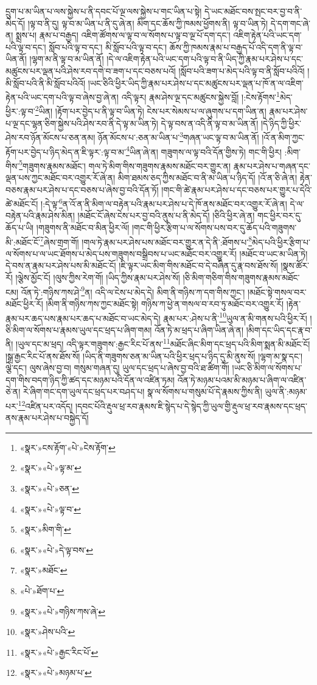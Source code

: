 དྲུག་པ་མ་ཡིན་པ་ལས་སྐྱེས་པ་ནི་དབང་པོ་ལྔ་ལས་སྐྱེས་པ་གང་ཡིན་པ་སྟེ། དེ་ཡང་མཐོང་བས་སྤང་བར་བྱ་བ་ནི་མེད་དོ། །ལྟ་བ་ནི་དུ། ལྟ་བ་མ་ཡིན་པ་ནི་དུ་ཞེ་ན། མིག་དང་ཆོས་ཀྱི་ཁམས་ཕྱོགས་ནི། ལྟ་བ་ཡིན་ཏེ། དེ་དག་གང་ཞེ་ན། སྨྲས་པ། རྣམ་པ་བརྒྱད། འཇིག་ཚོགས་ལ་ལྟ་བ་ལ་སོགས་པ་ལྟ་བ་ལྔ་པོ་དག་དང་། འཇིག་རྟེན་པའི་ཡང་དག་པའི་ལྟ་བ་དང་། སློབ་པའི་ལྟ་བ་དང་། མི་སློབ་པའི་ལྟ་བ་དང་། ཆོས་ཀྱི་ཁམས་རྣམ་པ་བརྒྱད་པོ་འདི་དག་ནི་ལྟ་བ་ཡིན་ནོ། །ལྷག་མ་ནི་ལྟ་བ་མ་ཡིན་ནོ། །དེ་ལ་འཇིག་རྟེན་པའི་ཡང་དག་པའི་ལྟ་བ་ནི་ཡིད་ཀྱི་རྣམ་པར་ཤེས་པ་དང་མཚུངས་པར་ལྡན་པའི་ཤེས་རབ་དགེ་བ་ཟག་པ་དང་བཅས་པའོ། །སློབ་པའི་ཟག་པ་མེད་པའི་ལྟ་བ་ནི་སློབ་པའིའོ། །མི་སློབ་པའི་ནི་མི་སློབ་པའིའོ། །ཡང་ཅིའི་ཕྱིར་ཡིད་ཀྱི་རྣམ་པར་ཤེས་པ་དང་མཚུངས་པར་ལྡན་པ་ཁོ་ན་ལ་འཇིག་རྟེན་པའི་ཡང་དག་པའི་ལྟ་བ་ཞེས་བྱ་ཞེ་ན། འདི་ལྟར། རྣམ་ཤེས་ལྔ་དང་མཚུངས་སྐྱེས་བློ། །:ངེས་རྟོགས་\footnote{«སྣར་»ངས་རྟོག་«པེ་»ངེས་རྟོག་}མེད་ཕྱིར་:ལྟ་བ་\footnote{«སྣར་»«པེ་»ལྟ་མ་}ཡིན། །རྟོག་པར་བྱེད་པ་ནི་ལྟ་བ་ཡིན་ཏེ། ངེས་པར་སེམས་པ་ལ་ཞུགས་པ་དག་ཡིན་ན། རྣམ་པར་ཤེས་པ་ལྔ་དང་ལྷན་ཅིག་སྐྱེས་པའི་ཤེས་རབ་ནི་དེ་ལྟ་མ་ཡིན་ཏེ། དེ་ལྟ་བས་ན་འདི་ནི་ལྟ་བ་མ་ཡིན་ནོ། །དེ་ཉིད་ཀྱི་ཕྱིར་ཤེས་རབ་ཉོན་མོངས་པ་ཅན་ནམ། ཉོན་མོངས་པ་:ཅན་མ་ཡིན་པ་\footnote{«སྣར་»«པེ་»ཅན་}གཞན་ཡང་ལྟ་བ་མ་ཡིན་ནོ། །འོ་ན་མིག་ཀྱང་རྟོག་པར་བྱེད་པ་ཉིད་མེད་ན་ཇི་ལྟར་:ལྟ་བ་མ་\footnote{«སྣར་»«པེ་»ལྟ་བ་}ཡིན་ཞེ་ན། གཟུགས་ལ་ལྟ་བའི་དོན་གྱིས་ཏེ། གང་གི་ཕྱིར། :མིག་གིས་\footnote{«སྣར་»མིག་གི་}གཟུགས་རྣམས་མཐོང་། གལ་ཏེ་མིག་གིས་གཟུགས་རྣམས་མཐོང་བར་གྱུར་ན། རྣམ་པར་ཤེས་པ་གཞན་དང་ལྡན་པས་ཀྱང་མཐོང་བར་འགྱུར་རོ་ཞེ་ན། མིག་ཐམས་ཅད་ཀྱིས་མཐོང་བ་ནི་མ་ཡིན་པ་ཉིད་དོ། །འོ་ན་ཅི་ཞེ་ན། རྟེན་བཅས་རྣམ་པར་ཤེས་པ་དང་བཅས་པ་ཞེས་བྱ་བའི་དོན་ཏོ། །གང་གི་ཚེ་རྣམ་པར་ཤེས་པ་དང་བཅས་པར་གྱུར་པ་དེའི་ཚེ་མཐོང་ངོ། །:དེ་ལྟ་\footnote{«སྣར་»«པེ་»དེ་ལྟ་བས་}ན་འོ་ན་ནི་མིག་ལ་བརྟེན་པའི་རྣམ་པར་ཤེས་པ་དེ་ཁོ་ནས་མཐོང་བར་འགྱུར་རོ་ཞེ་ན། དེ་ལ་བརྟེན་པའི་རྣམ་ཤེས་མིན། །མཐོང་ངོ་ཞེས་ངེས་པར་བྱ་བའི་ནུས་པ་ནི་མེད་དོ། །ཅིའི་ཕྱིར་ཞེ་ན། གང་ཕྱིར་བར་དུ་ཆོད་པ་ཡི། །གཟུགས་ནི་མཐོང་བ་མིན་ཕྱིར་ལོ། །གང་གི་ཕྱིར་རྩིག་པ་ལ་སོགས་པས་བར་དུ་ཆོད་པའི་གཟུགས་མི་:མཐོང་ངོ་\footnote{«སྣར་»མཐོང་}ཞེས་གྲག་གོ། །གལ་ཏེ་རྣམ་པར་ཤེས་པས་མཐོང་བར་གྱུར་ན་དེ་ནི་:ཐོགས་པ་\footnote{«པེ་»ཐོག་པ་}མེད་པའི་ཕྱིར་རྩིག་པ་ལ་སོགས་པ་ལ་ཡང་ཐོགས་པ་མེད་པས་གཟུགས་བསྒྲིབས་པ་ཡང་མཐོང་བར་འགྱུར་རོ། །མཐོང་བ་ཡང་མ་ཡིན་ཏེ། དེ་བས་ན་རྣམ་པར་ཤེས་པས་མི་མཐོང་ངོ། །ཇི་ལྟར་ཡང་མིག་གིས་མཐོང་བ་དེ་བཞིན་དུ་རྣ་བས་ཐོས་སོ། །སྣས་ཚོར་རོ། །ལྕེས་མྱོང་ངོ། །ལུས་ཀྱིས་རེག་གོ། །ཡིད་ཀྱིས་རྣམ་པར་ཤེས་སོ། །ཅི་མིག་གཅིག་གིས་གཟུགས་རྣམས་མཐོང་ངམ། འོན་ཏེ་:གཉིས་ཀས་ཤེ་\footnote{«སྣར་»«པེ་»གཉིས་ཀས་ཞེ་}ན། འདི་ལ་ངེས་པ་མེད་དེ། མིག་ནི་གཉིས་ཀ་དག་གིས་ཀྱང་། །མཐོང་སྟེ་གསལ་བར་མཐོང་ཕྱིར་རོ། །མིག་ནི་གཉིས་ཀས་ཀྱང་མཐོང་སྟེ། གཉིས་ཀ་ཕྱེ་ན་གསལ་བ་རབ་ཏུ་མཐོང་བར་འགྱུར་རོ། །རྟེན་རྣམ་པར་ཆད་པས་རྣམ་པར་ཆད་པ་མཐོང་བ་ཡང་མེད་དེ། རྣམ་པར་:ཤེས་པ་ནི་\footnote{«སྣར་»ཤེས་པའི་}ཡུལ་ན་མི་གནས་པའི་ཕྱིར་རོ། །ཅི་མིག་ལ་སོགས་པ་རྣམས་ཡུལ་དང་ཕྲད་པ་ཞིག་གམ། འོན་ཏེ་མ་ཕྲད་པ་ཞིག་ཡིན་ཞེ་ན། །མིག་དང་ཡིད་དང་རྣ་བ་ནི། །ཡུལ་དང་མ་ཕྲད། འདི་ལྟར་གཟུགས་:རྒྱང་རིང་པོ་ནས་\footnote{«སྣར་»«པེ་»རྒྱང་རིང་པོ་}མཐོང་ཞིང་མིག་དང་ཕྲད་པའི་མིག་སྨན་མི་མཐོང་ངོ། །སྒྲ་རྒྱང་རིང་པོ་ནས་ཐོས་སོ། །ཡིད་ནི་གཟུགས་ཅན་མ་ཡིན་པའི་ཕྱིར་ཕྲད་པ་ཉིད་དུ་མི་ནུས་སོ། །ལྷག་མ་སྣ་དང་། ལྕེ་དང་། ལུས་ཞེས་བྱ་བ། གསུམ་གཞན་དུ། ཡུལ་དང་ཕྲད་པ་ཞེས་བྱ་བའི་ཐ་ཚིག་གོ། །ཡང་ཅི་མིག་ལ་སོགས་པ་དག་གིས་བདག་ཉིད་ཀྱི་ཚད་དང་མཉམ་པའི་དོན་ལ་འཛིན་ཏམ། འོན་ཏེ་མཉམ་པའམ་མི་མཉམ་པ་ཞིག་ལ་འཛིན་ཅེ་ན། རེ་ཞིག་གང་དག་ཡུལ་དང་ཕྲད་པར་བཤད་པ། སྣ་ལ་སོགས་པ་གསུམ་པོ་དེ་རྣམས་ཀྱིས་ནི། ཡུལ་ནི་:མཉམ་པར་\footnote{«སྣར་»«པེ་»མཉམ་པ་}འཛིན་པར་འདོད། །དབང་པོའི་རྡུལ་ཕྲ་རབ་རྣམས་ཇི་སྙེད་པ་དེ་སྙེད་ཀྱི་ཡུལ་གྱི་རྡུལ་ཕྲ་རབ་རྣམས་དང་ཕྲད་ནས་རྣམ་པར་ཤེས་པ་བསྐྱེད་དོ། 